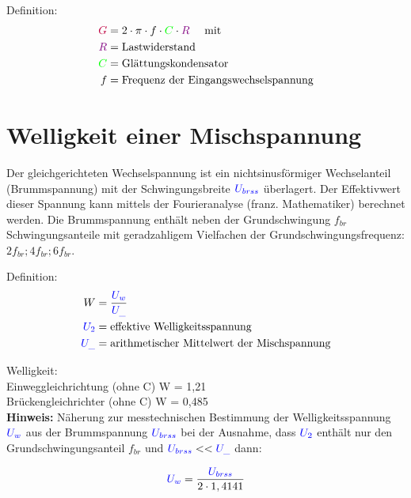 \documentclass[11pt,a4paper,titlepage]{scrreprt}
\begin{document}
           Definition:
           \begin{align*}
           \textcolor{purple}{G} &= 2 \cdot \pi \cdot f \cdot \textcolor{green}{C} \cdot \textcolor{violet}{R} \quad \text{ mit }\\
           \textcolor{violet}{R} &= \text{Lastwiderstand} \\
           \textcolor{green}{C} &= \text{Glättungskondensator}\\
           f &= \text{Frequenz der Eingangswechselspannung}
           \end{align*}
           \section{Welligkeit einer Mischspannung}
           Der  gleichgerichteten  Wechselspannung  ist  ein  nichtsinusförmiger  Wechselanteil  (Brummspannung)  mit  der  Schwingungsbreite  $\textcolor{blue}{U_{brss}}$ überlagert.  Der  Effektivwert  dieser  Spannung  kann  mittels  der  Fourieranalyse  (franz.  Mathematiker)  berechnet  werden.  Die  Brummspannung  enthält neben  der  Grundschwingung  $f_{br}$ Schwingungsanteile  mit  geradzahligem Vielfachen  der  Grundschwingungsfrequenz: $2f_{br}; 4f_{br}; 6f_{br}$.

           Definition:
           \begin{align*}
           W &= \frac{\textcolor{blue}{U_w}}{\textcolor{blue}{U_{\_}}}\\
           \textcolor{blue}{U_2} &= \text{effektive Welligkeitsspannung}\\
           \textcolor{blue}{U_{\_}} &= \text{arithmetischer Mittelwert der Mischspannung} 
           \end{align*}
           
           
           Welligkeit:\\
           Einweggleichrichtung (ohne C)   W = 1,21\\
           Brückengleichrichter  (ohne C)    W = 0,485\\
           
           \textbf{Hinweis:} Näherung  zur messtechnischen Bestimmung  der  Welligkeitsspannung $\textcolor{blue}{U_w}$ aus  der  Brummspannung $\textcolor{blue}{U_{brss}}$ bei der Ausnahme, dass $\textcolor{blue}{U_2}$ enthält nur den Grundschwingungsanteil $f_{br}$ und $\textcolor{blue}{U_{brss}} << \textcolor{blue}{U_{\_}}$ dann:
           
           \begin{equation*}
           \textcolor{blue}{U_w} = \frac{\textcolor{blue}{U_{brss}}}{ 2 \cdot 1,4141}
           \end{equation*}
 
\end{document}
